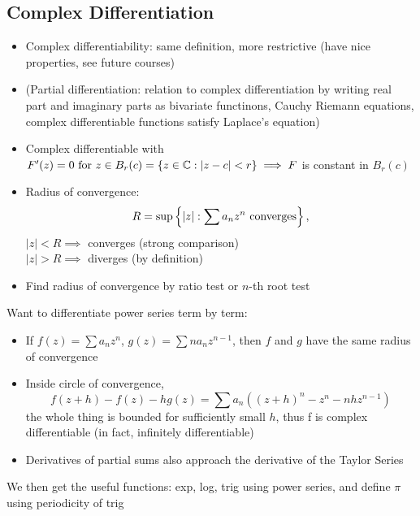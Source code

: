 \subsection*{Complex Differentiation}
\begin{itemize}
      \item Complex differentiability: same definition, more restrictive (have nice properties, see future courses)
      \item (Partial differentiation: relation to complex differentiation by writing real part and imaginary parts as bivariate functinons, Cauchy Riemann equations, complex differentiable functions satisfy Laplace's equation)
      \item Complex differentiable with $F'(z) = 0 \text{ for } z \in B_r(c) = \{z \in \mathbb{C} :|z-c| < r\} \\ \implies F$ is constant in $B_r(c)$
      \item Radius of convergence: \[R= \sup \left\{ \left| z \right|:\sum a_n z^n \text{ converges} \right\},\]
            $|z|<R \implies $ converges (strong comparison)\\
            $|z|>R \implies $ diverges (by definition)
      \item Find radius of convergence by ratio test or $n$-th root test
\end{itemize}
Want to differentiate power series term by term:
\begin{itemize}
      \item If $f(z) = \sum a_n z^n$, $g(z) = \sum n a_n z^{n-1}$, then $f$ and $g$ have the same radius of convergence
      \item Inside circle of convergence, \[f(z+h)-f(z)-hg(z) = \sum a_n((z+h)^n-z^n-nhz^{n-1})\] the whole thing is bounded for sufficiently small $h$, thus f is complex differentiable (in fact, infinitely differentiable)
      \item Derivatives of partial sums also approach the derivative of the Taylor Series
\end{itemize}
We then get the useful functions: exp, log, trig using power series, and define $\pi$ using periodicity of trig


